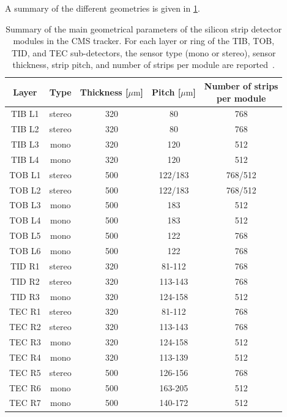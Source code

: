A summary of the different geometries is given in \cref{tab:tracker_modules}.

\clearpage

\begin{table}[ht]
    \centering
    \small
    \renewcommand{\arraystretch}{1.2}
    \begin{tabular}{|c|c|c|c|c|}
        \hline
        Layer & Type & Thickness [$\mu\textrm{m}$] & Pitch [$\mu\textrm{m}$] & \makecell{Number of strips \\ per module} \\ \hline \hline
        TIB L1 & stereo & 320 & 80 & 768 \\
        TIB L2 & stereo & 320 & 80 & 768 \\
        TIB L3 & mono & 320 & 120 & 512 \\
        TIB L4 & mono & 320 & 120 & 512 \\ \hline
        TOB L1 & stereo & 500 & 122/183 & 768/512 \\
        TOB L2 & stereo & 500 & 122/183 & 768/512 \\
        TOB L3 & mono & 500 & 183 & 512 \\
        TOB L4 & mono & 500 & 183 & 512 \\
        TOB L5 & mono & 500 & 122 & 768 \\
        TOB L6 & mono & 500 & 122 & 768 \\ \hline
        TID R1 & stereo & 320 & 81-112 & 768 \\
        TID R2 & stereo & 320 & 113-143 & 768 \\
        TID R3 & mono & 320 & 124-158 & 512 \\ \hline
        TEC R1 & stereo & 320 & 81-112 & 768 \\
        TEC R2 & stereo & 320 & 113-143 & 768 \\ 
        TEC R3 & mono & 320 & 124-158 & 512 \\
        TEC R4 & mono & 320 & 113-139 & 512 \\
        TEC R5 & stereo & 500 & 126-156 & 768 \\
        TEC R6 & mono & 500 & 163-205 & 512 \\
        TEC R7 & mono & 500 & 140-172 & 512 \\ \hline
    \end{tabular}
    \caption{Summary of the main geometrical parameters of the silicon strip detector modules in the CMS tracker. For each layer or ring of the TIB, TOB, TID, and TEC sub-detectors, the sensor type (mono or stereo), sensor thickness, strip pitch, and number of strips per module are reported~\cite{CMStracker}.}
    \label{tab:tracker_modules}
\end{table}


